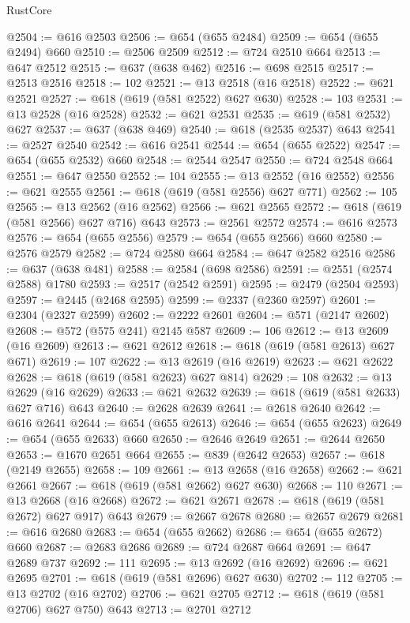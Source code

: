 \begin{lexlean}{RustCore}
\begin{coremodule}
@2504 := @616 @2503
@2506 := @654 (@655 @2484)
@2509 := @654 (@655 @2494) @660
@2510 := @2506 @2509
@2512 := @724 @2510 @664
@2513 := @647 @2512
@2515 := @637 (@638 @462)
@2516 := @698 @2515
@2517 := @2513 @2516
@2518 := 102
@2521 := @13 @2518 (@16 @2518)
@2522 := @621 @2521
@2527 := @618 (@619 (@581 @2522) @627 @630)
@2528 := 103
@2531 := @13 @2528 (@16 @2528)
@2532 := @621 @2531
@2535 := @619 (@581 @2532) @627
@2537 := @637 (@638 @469)
@2540 := @618 (@2535 @2537) @643
@2541 := @2527 @2540
@2542 := @616 @2541
@2544 := @654 (@655 @2522)
@2547 := @654 (@655 @2532) @660
@2548 := @2544 @2547
@2550 := @724 @2548 @664
@2551 := @647 @2550
@2552 := 104
@2555 := @13 @2552 (@16 @2552)
@2556 := @621 @2555
@2561 := @618 (@619 (@581 @2556) @627 @771)
@2562 := 105
@2565 := @13 @2562 (@16 @2562)
@2566 := @621 @2565
@2572 := @618 (@619 (@581 @2566) @627 @716) @643
@2573 := @2561 @2572
@2574 := @616 @2573
@2576 := @654 (@655 @2556)
@2579 := @654 (@655 @2566) @660
@2580 := @2576 @2579
@2582 := @724 @2580 @664
@2584 := @647 @2582 @2516
@2586 := @637 (@638 @481)
@2588 := @2584 (@698 @2586)
@2591 := @2551 (@2574 @2588) @1780
@2593 := @2517 (@2542 @2591)
@2595 := @2479 (@2504 @2593)
@2597 := @2445 (@2468 @2595)
@2599 := @2337 (@2360 @2597)
@2601 := @2304 (@2327 @2599)
@2602 := @2222 @2601
@2604 := @571 (@2147 @2602)
@2608 := @572 (@575 @241) @2145 @587
@2609 := 106
@2612 := @13 @2609 (@16 @2609)
@2613 := @621 @2612
@2618 := @618 (@619 (@581 @2613) @627 @671)
@2619 := 107
@2622 := @13 @2619 (@16 @2619)
@2623 := @621 @2622
@2628 := @618 (@619 (@581 @2623) @627 @814)
@2629 := 108
@2632 := @13 @2629 (@16 @2629)
@2633 := @621 @2632
@2639 := @618 (@619 (@581 @2633) @627 @716) @643
@2640 := @2628 @2639
@2641 := @2618 @2640
@2642 := @616 @2641
@2644 := @654 (@655 @2613)
@2646 := @654 (@655 @2623)
@2649 := @654 (@655 @2633) @660
@2650 := @2646 @2649
@2651 := @2644 @2650
@2653 := @1670 @2651 @664
@2655 := @839 (@2642 @2653)
@2657 := @618 (@2149 @2655)
@2658 := 109
@2661 := @13 @2658 (@16 @2658)
@2662 := @621 @2661
@2667 := @618 (@619 (@581 @2662) @627 @630)
@2668 := 110
@2671 := @13 @2668 (@16 @2668)
@2672 := @621 @2671
@2678 := @618 (@619 (@581 @2672) @627 @917) @643
@2679 := @2667 @2678
@2680 := @2657 @2679
@2681 := @616 @2680
@2683 := @654 (@655 @2662)
@2686 := @654 (@655 @2672) @660
@2687 := @2683 @2686
@2689 := @724 @2687 @664
@2691 := @647 @2689 @737
@2692 := 111
@2695 := @13 @2692 (@16 @2692)
@2696 := @621 @2695
@2701 := @618 (@619 (@581 @2696) @627 @630)
@2702 := 112
@2705 := @13 @2702 (@16 @2702)
@2706 := @621 @2705
@2712 := @618 (@619 (@581 @2706) @627 @750) @643
@2713 := @2701 @2712

\end{coremodule}
\end{lexlean}
